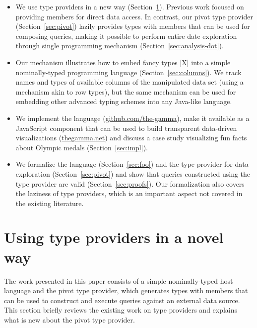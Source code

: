 \documentclass[a4paper,UKenglish]{lipics-v2016}
\theoremstyle{plain}
\theoremstyle{definition}
\begin{document}
\begin{itemize}
\item We use type providers in a new way (Section~\ref{sec:tps}). Previous work focused on providing 
  members for direct data access. In contrast, our pivot type provider (Section~\ref{sec:pivot}) lazily 
  provides types with members that can be used for composing queries, making it possible to perform
  entire date exploration through single programming mechanism (Section~\ref{sec:analysis-dot}).  

\item Our mechanism illustrates how to embed fancy types [X] into a simple nominally-typed programming  
  language (Section~\ref{sec:columns}). We track names and types of available columns of the 
  manipulated data set (using a mechanism akin to row types), but the same mechanism can be used for 
  embedding other advanced typing schemes into any Java-like language.
  
\item We implement the language (\url{github.com/the-gamma}), make it available as a JavaScript 
  component that can be used to build transparent data-driven visualizations (\url{thegamma.net}) 
  and discuss a case study visualizing fun facts about Olympic medals (Section~\ref{sec:impl}).

\item We formalize the language (Section~\ref{sec:foo}) and the type provider for data exploration
  (Section~\ref{sec:pivot}) and show that queries constructed using the type provider are valid
  (Section~\ref{sec:proofs}). Our formalization also covers the laziness of type providers, which
  is an important aspect not covered in the existing literature.
\end{itemize}


\section{Using type providers in a novel way}
\label{sec:tps}

The work presented in this paper consists of a simple nominally-typed host language and the pivot
type provider, which generates types with members that can be used to construct and execute queries
against an external data source. This section briefly reviews the existing work on type providers
and explains what is new about the pivot type provider.
\end{document}

